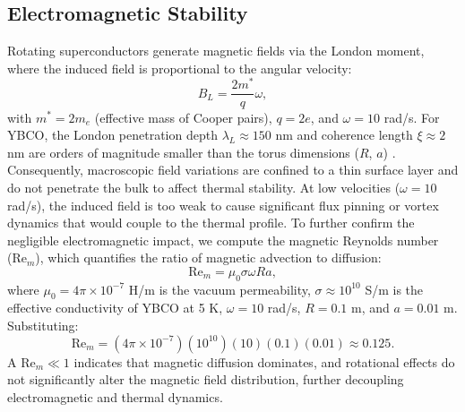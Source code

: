 \documentclass[12pt]{article}
\begin{document}
\subsection{Electromagnetic Stability}
Rotating superconductors generate magnetic fields via the London moment, where the induced field is proportional to the angular velocity:
\begin{equation}
    B_L = \frac{2 m^*}{q} \omega,
\end{equation}
with $m^* = 2 m_e$ (effective mass of Cooper pairs), $q = 2e$, and $\omega = 10$ rad/s. For YBCO, the London penetration depth $\lambda_L \approx 150$ nm and coherence length $\xi \approx 2$ nm are orders of magnitude smaller than the torus dimensions ($R$, $a$) \citep{Tinkham2004}. Consequently, macroscopic field variations are confined to a thin surface layer and do not penetrate the bulk to affect thermal stability. At low velocities ($\omega = 10$ rad/s), the induced field is too weak to cause significant flux pinning or vortex dynamics that would couple to the thermal profile. To further confirm the negligible electromagnetic impact, we compute the magnetic Reynolds number (Re$_m$), which quantifies the ratio of magnetic advection to diffusion:
\begin{equation}
    \text{Re}_m = \mu_0 \sigma \omega R a,
\end{equation}
where $\mu_0 = 4\pi \times 10^{-7}$ H/m is the vacuum permeability, $\sigma \approx 10^{10}$ S/m is the effective conductivity of YBCO at 5 K, $\omega = 10$ rad/s, $R = 0.1$ m, and $a = 0.01$ m. Substituting:
\begin{equation}
    \text{Re}_m = (4\pi \times 10^{-7})(10^{10})(10)(0.1)(0.01) \approx 0.125.
\end{equation}
A Re$_m \ll 1$ indicates that magnetic diffusion dominates, and rotational effects do not significantly alter the magnetic field distribution, further decoupling electromagnetic and thermal dynamics.
\end{document}
